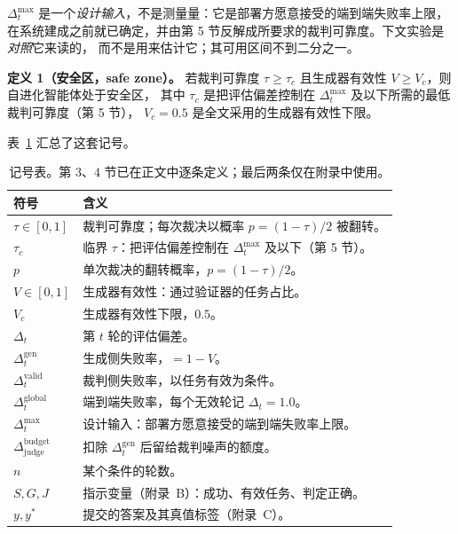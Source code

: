 \documentclass{article}
\begin{document}
$\Delta_t^{\max}$ 是一个\emph{设计输入}，不是测量量：它是部署方愿意接受的端到端失败率上限，
在系统建成之前就已确定，并由第 5 节反解成所要求的裁判可靠度。下文实验是\emph{对照}它来读的，
而不是用来估计它；其可用区间不到二分之一。

\textbf{定义 1（安全区，safe zone）。} 若裁判可靠度
$\tau \ge \tau_c$ 且生成器有效性 $V \ge V_c$，则自进化智能体处于安全区，
其中 $\tau_c$ 是把评估偏差控制在 $\Delta_t^{\max}$ 及以下所需的最低裁判可靠度（第 5 节），
$V_c = 0.5$ 是全文采用的生成器有效性下限。

表~\ref{tab:notation} 汇总了这套记号。

\begin{table}[t]
  \centering
  \caption{记号表。第 3、4 节已在正文中逐条定义；最后两条仅在附录中使用。}
  \label{tab:notation}
  \small
  \begin{tabularx}{\textwidth}{@{}lX@{}}
    \toprule
    符号 & 含义 \\
    \midrule
    $\tau \in [0,1]$ & 裁判可靠度；每次裁决以概率 $p = (1-\tau)/2$ 被翻转。 \\
    $\tau_c$ & 临界 $\tau$：把评估偏差控制在 $\Delta_t^{\max}$ 及以下（第 5 节）。 \\
    $p$ & 单次裁决的翻转概率，$p = (1-\tau)/2$。 \\
    $V \in [0,1]$ & 生成器有效性：通过验证器的任务占比。 \\
    $V_c$ & 生成器有效性下限，$0.5$。 \\
    $\Delta_t$ & 第 $t$ 轮的评估偏差。 \\
    \midrule
    $\Delta_t^{\mathrm{gen}}$ & 生成侧失败率，$= 1 - V$。 \\
    $\Delta_t^{\mathrm{valid}}$ & 裁判侧失败率，以任务有效为条件。 \\
    $\Delta_t^{\mathrm{global}}$ & 端到端失败率，每个无效轮记 $\Delta_t = 1.0$。 \\
    $\Delta_t^{\max}$ & 设计输入：部署方愿意接受的端到端失败率上限。 \\
    $\Delta_{\mathrm{judge}}^{\mathrm{budget}}$ & 扣除 $\Delta_t^{\mathrm{gen}}$ 后留给裁判噪声的额度。 \\
    $n$ & 某个条件的轮数。 \\
    \midrule
    $S, G, J$ & 指示变量（附录~B）：成功、有效任务、判定正确。 \\
    $y, y^{*}$ & 提交的答案及其真值标签（附录~C）。 \\
    \bottomrule
  \end{tabularx}
\end{table}
\end{document}
